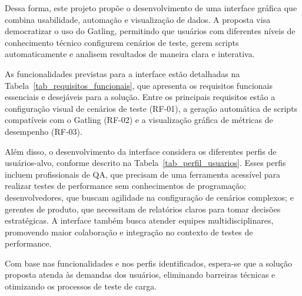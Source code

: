 \documentclass[
	12pt,
	openright,
	twoside,
	a4paper,
	english,
	brazil
	]{abntex2}
\begin{document}
Dessa forma, este projeto propõe o desenvolvimento de uma interface gráfica que combina usabilidade, automação e visualização de dados. A proposta visa democratizar o uso do Gatling, permitindo que usuários com diferentes níveis de conhecimento técnico configurem cenários de teste, gerem scripts automaticamente e analisem resultados de maneira clara e interativa.

As funcionalidades previstas para a interface estão detalhadas na Tabela~\ref{tab_requisitos_funcionais}, que apresenta os requisitos funcionais essenciais e desejáveis para a solução. Entre os principais requisitos estão a configuração visual de cenários de teste (RF-01), a geração automática de scripts compatíveis com o Gatling (RF-02) e a visualização gráfica de métricas de desempenho (RF-03). %

Além disso, o desenvolvimento da interface considera os diferentes perfis de usuários-alvo, conforme descrito na Tabela~\ref{tab_perfil_usuarios}. Esses perfis incluem profissionais de QA, que precisam de uma ferramenta acessível para realizar testes de performance sem conhecimentos de programação; desenvolvedores, que buscam agilidade na configuração de cenários complexos; e gerentes de produto, que necessitam de relatórios claros para tomar decisões estratégicas. A interface também busca atender equipes multidisciplinares, promovendo maior colaboração e integração no contexto de testes de performance.

Com base nas funcionalidades e nos perfis identificados, espera-se que a solução proposta atenda às demandas dos usuários, eliminando barreiras técnicas e otimizando os processos de teste de carga. %
\end{document}
